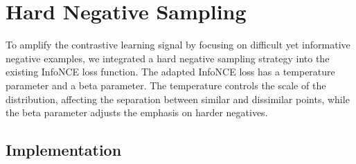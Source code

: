 \section{Hard Negative Sampling}

To amplify the contrastive learning signal by focusing on difficult yet informative negative examples, we integrated a hard negative sampling strategy into the existing InfoNCE loss function. The adapted InfoNCE loss has a temperature parameter and a beta parameter. The temperature controls the scale of the distribution, affecting the separation between similar and dissimilar points, while the beta parameter adjusts the emphasis on harder negatives.

\subsection{Implementation}

